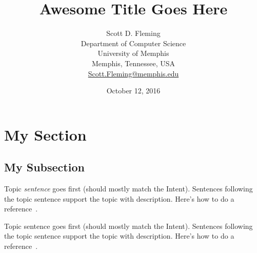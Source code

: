 \documentclass[11pt, letterpaper, onecolumn]{article}
\begin{document}

\title{Awesome Title Goes Here}

\author{%
Scott D. Fleming\\%
Department of Computer Science\\%
University of Memphis\\%
Memphis, Tennessee, USA\\%
\href{mailto:Scott.Fleming@memphis.edu}{Scott.Fleming@memphis.edu}%
}

\date{October 12, 2016}

\maketitle



\section{My Section}


\subsection{My Subsection}



%
Topic \emph{sentence} goes first (should mostly match the Intent).
%
Sentences following the topic sentence support the topic with description.
%
Here's how to do a reference~\cite{guzdial2008education}.



%
Topic sentence goes first (should mostly match the Intent).
%
Sentences following the topic sentence support the topic with description.
%
Here's how to do a reference~\cite{brennan2012new}.







\end{document}
